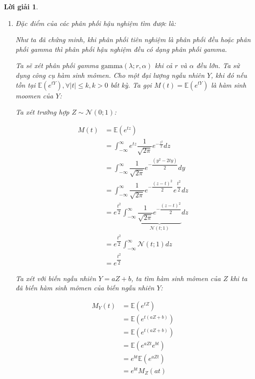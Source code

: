 \documentclass[14pt, a4paper]{article}
\theoremstyle{sltheorem}
\theoremstyle{soltheorem}
\newtheorem*{loigiai}{Lời giải}
\begin{document}
\begin{loigiai}
\begin{enumerate}
\begin{enumerate}[label=(\alph*)]
            Như vậy ta nhận thấy phân phối hậu nghiệm $g(\lambda \vert X_1 =x_1, X_2=x_2, \dots, X_n=x_n)$ của $\lambda$ cũng chính là phân phối gamma khi phân phối tiên nghiệm của $\lambda$ là phân phối gamma.
        \end{enumerate}
        \item Đặc điểm của các phân phối hậu nghiệm tìm được là:
        
        Như ta đã chứng minh, khi phân phối tiên nghiệm là phân phối đều hoặc phân phối gamma thì phân phối hậu nghiệm đều có dạng phân phối gamma.

        Ta sẽ xét phân phối gamma $\text{gamma}(\lambda; r, \alpha)$ khi cả $r$ và $\alpha$ đều lớn.
        Ta sử dụng công cụ hàm sinh mômen.
        Cho một đại lượng ngẫu nhiên $Y$, khi đó nếu tồn tại $\mathbb{E}(e^{tY}), \forall \lvert t \rvert \leq k, k > 0$ bất kỳ.
        Ta gọi $M(t) = \mathbb{E}(e^{tY})$ là hàm sinh moomen của $Y$:

        Ta xét trường hợp $Z \sim \mathcal{N}(0; 1)$:

        \begin{equation*}
            \begin{aligned}
                M(t) &= \mathbb{E}(e^{tz}) \\
                &=\int_{-\infty}^{\infty} e^{tz} \dfrac{1}{\sqrt{2\pi}} e^{-\frac{z^2}{2}} dz \\
                &=\int_{-\infty}^{\infty} \dfrac{1}{\sqrt{2\pi}} e^{-\dfrac{(y^2-2ty)}{2}} dy \\
                &=\int_{-\infty}^{\infty} \dfrac{1}{\sqrt{2\pi}} e^{-\dfrac{(z-t)^2}{2}}e^{\dfrac{t^2}{2}} dz \\
                &=e^{\dfrac{t^2}{2}}\int_{-\infty}^{\infty} \underbrace{\dfrac{1}{\sqrt{2\pi}} e^{-\dfrac{(z-t)^2}{2}}}_{\mathcal{N}(t;1)} dz \\
                &=e^{\dfrac{t^2}{2}}\int_{-\infty}^{\infty} \mathcal{N}(t;1) dz \\
                &=e^{\dfrac{t^2}{2}}
            \end{aligned}
        \end{equation*}

        Ta xét với biến ngẫu nhiên $Y = aZ + b$, ta tìm hàm sinh mômen của $Z$ khi ta đã biến hàm sinh mômen của biến ngẫu nhiên $Y$:

        \begin{equation*}
            \begin{aligned}
                M_Y (t) &= \mathbb{E} (e^{tZ}) \\
                &= \mathbb{E} (e^{t(aZ + b)}) \\
                &= \mathbb{E} (e^{t(aZ + b)}) \\
                &= \mathbb{E} (e^{aZt}e^{bt}) \\
                &= e^{bt} \mathbb{E}(e^{aZt}) \\
                &= e^{bt} M_Z(at)
            \end{aligned}
        \end{equation*}


\end{enumerate}
\end{loigiai}
\end{document}
